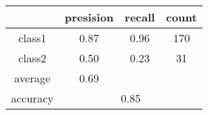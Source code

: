 
    \begin{tabular}{ | c | c | c | c | }
	\hline
	         &presision & recall & count \\ \hline
	class1   & 0.87    & 0.96  & 170 \\ \hline
	class2   & 0.50    & 0.23  & 31 \\ \hline
	average  & 0.69    &        &       \\
	\hline
	accuracy & \multicolumn{3}{c|}{0.85}\\
	\hline
    \end{tabular}